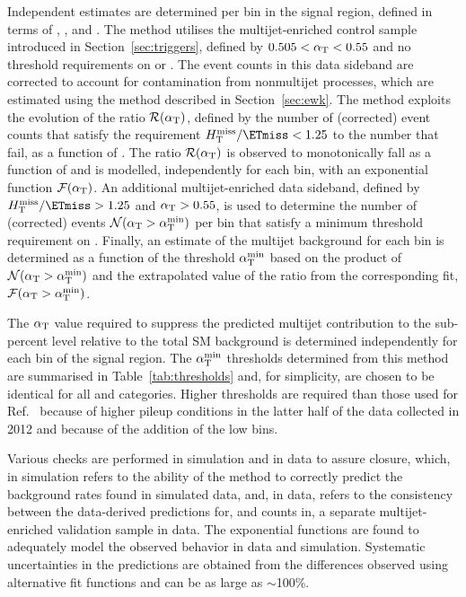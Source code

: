 Independent estimates are determined per bin in the signal region,
defined in terms of \njet, \nb, and \scalht. The method utilises the
multijet-enriched control sample introduced in
Section~\ref{sec:triggers}, defined by $0.505 < \alpha_\mathrm{T} < 0.55$ and no
threshold requirements on \dphi or \mhtmet. The event counts in this
data sideband are corrected to account for contamination from
nonmultijet processes, which are estimated using the method described
in Section~\ref{sec:ewk}. The method exploits the evolution of the
ratio $\mathcal{R}(\alpha_\mathrm{T})$, defined by the number of (corrected)
event counts that satisfy the requirement $\mhtmet < 1.25$ to the
number that fail, as a function of \alphat. The ratio
$\mathcal{R}(\alpha_\mathrm{T})$ is observed to monotonically fall as a function
of \alphat and is modelled, independently for each bin, with an
exponential function $\mathcal{F}(\alpha_\mathrm{T})$. An additional
multijet-enriched data sideband, defined by $\mhtmet > 1.25$ and
$\alpha_\mathrm{T} > 0.55$, is used to determine the number of (corrected)
events $\mathcal{N}(\alpha_\mathrm{T} > \alpha_\mathrm{T}^\text{min})$ per bin that satisfy a
minimum threshold requirement on \alphat. Finally, an estimate of the
multijet background for each bin is determined as a function of the
threshold $\alpha_\mathrm{T}^\text{min}$ based on the product of $\mathcal{N}(\alpha_\mathrm{T} >
\alpha_\mathrm{T}^\text{min})$ and the extrapolated value of the ratio from the
corresponding fit, $\mathcal{F}(\alpha_\mathrm{T} > \alpha_\mathrm{T}^\text{min})$.

The $\alpha_\mathrm{T}$ value required to suppress the predicted multijet
contribution to the sub-percent level relative to the total SM
background is determined independently for each bin of the signal
region. The $\alpha_\mathrm{T}^\text{min}$ thresholds determined from this method are
summarised in Table~\ref{tab:thresholds} and, for simplicity, are
chosen to be identical for all \njet and \nb categories. Higher
\alphat thresholds are required than those used for
Ref.~\cite{RA1Paper2012} because of higher pileup conditions in the
latter half of the data collected in 2012 and because of the addition
of the low \scalht bins.

Various checks are performed in simulation and in data to assure
closure, which, in simulation refers to the ability of the method to
correctly predict the background rates found in simulated data, and,
in data, refers to the consistency between the data-derived
predictions for, and counts in, a separate multijet-enriched
validation sample in data. The exponential functions are found to
adequately model the observed behavior in data and
simulation. Systematic uncertainties in the predictions are obtained
from the differences observed using alternative fit functions and can
be as large as $\sim$100\%.


